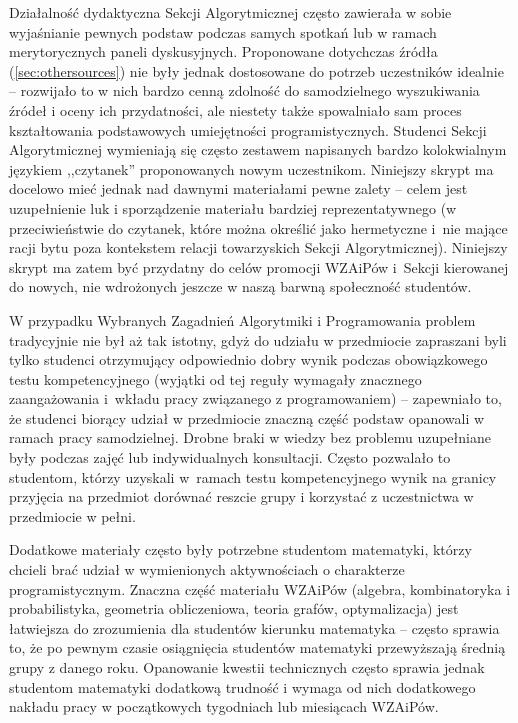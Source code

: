 Działalność dydaktyczna Sekcji Algorytmicznej często zawierała w sobie
wyjaśnianie pewnych podstaw podczas samych spotkań lub w ramach merytorycznych
paneli dyskusyjnych. Proponowane dotychczas źródła (\ref{sec:othersources}) nie
były jednak dostosowane do potrzeb uczestników idealnie -- rozwijało to w nich
bardzo cenną zdolność do samodzielnego wyszukiwania źródeł i oceny ich
przydatności, ale niestety także spowalniało sam proces kształtowania
podstawowych umiejętności programistycznych. Studenci Sekcji Algorytmicznej
wymieniają się często zestawem napisanych bardzo kolokwialnym językiem
,,czytanek'' proponowanych nowym uczestnikom. Niniejszy skrypt ma docelowo mieć
jednak nad dawnymi materiałami pewne zalety -- celem jest uzupełnienie luk
i sporządzenie materiału bardziej reprezentatywnego (w przeciwieństwie do
czytanek, które można określić jako hermetyczne i~nie mające racji bytu poza
kontekstem relacji towarzyskich Sekcji Algorytmicznej). Niniejszy skrypt ma
zatem być przydatny do celów promocji WZAiPów i~Sekcji kierowanej do nowych,
nie wdrożonych jeszcze w naszą barwną społeczność studentów.

W przypadku Wybranych Zagadnień Algorytmiki i Programowania problem tradycyjnie
nie był aż tak istotny, gdyż do udziału w przedmiocie zapraszani byli tylko
studenci otrzymujący odpowiednio dobry wynik podczas obowiązkowego testu
kompetencyjnego (wyjątki od tej reguły wymagały znacznego zaangażowania
i~wkładu pracy związanego z programowaniem) -- zapewniało to, że studenci
biorący udział w przedmiocie znaczną część podstaw opanowali w ramach pracy
samodzielnej. Drobne braki w wiedzy bez problemu uzupełniane były podczas zajęć
lub indywidualnych konsultacji. Często pozwalało to studentom, którzy uzyskali
w~ramach testu kompetencyjnego wynik na granicy przyjęcia na przedmiot dorównać
reszcie grupy i korzystać z uczestnictwa w przedmiocie w pełni.

Dodatkowe materiały często były potrzebne studentom matematyki, którzy chcieli
brać udział w wymienionych aktywnościach o charakterze programistycznym. Znaczna
część materiału WZAiPów (algebra, kombinatoryka i probabilistyka, geometria
obliczeniowa, teoria grafów, optymalizacja) jest łatwiejsza do zrozumienia dla
studentów kierunku matematyka -- często sprawia to, że po pewnym czasie
osiągnięcia studentów matematyki przewyższają średnią grupy z danego roku.
Opanowanie kwestii technicznych często sprawia jednak studentom matematyki
dodatkową trudność i wymaga od nich dodatkowego nakładu pracy w początkowych
tygodniach lub miesiącach WZAiPów. 


